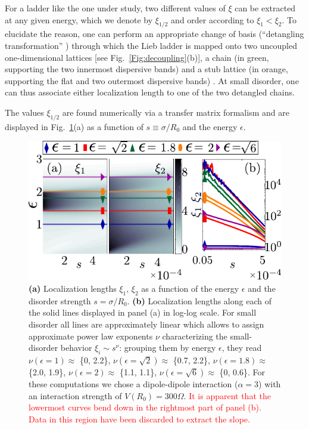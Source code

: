 \documentclass[prl,aps,twocolumn,showpacs,superscriptaddress,longbibliography]{revtex4-1}
\newcommand{\changer}[1]{\textcolor{red}{#1}}
\begin{document}
For a ladder like the one under study, two different values of $\xi$ can be extracted at any given energy, which we denote by $\xi_{1/2}$ and order according to $\xi_1 < \xi_2$. To elucidate the reason, one can perform an appropriate change of basis (``detangling transformation'' \cite{a_Flach_EPL_14,Leykam2017}) through which the Lieb ladder is mapped onto two uncoupled one-dimensional lattices [see Fig.~\ref{Fig:decoupling}(b)], a chain (in green, supporting the two innermost dispersive bands) and a stub lattice (in orange, supporting the flat and two outermost dispersive bands) \cite{SM}. At small disorder, one can thus associate either localization length to one of the two detangled chains.

The values $\xi_{1/2}$ are found numerically via a transfer matrix formalism and are displayed in Fig.~\ref{Fig:2D_loc_length}(a) as a function of $s \equiv \sigma / R_0$ and the energy $\epsilon$.
\begin{figure}
\includegraphics[width=\columnwidth]{Figure3.pdf}
\caption{\textbf{(a)} Localization lengths $\xi_1,\,\xi_2$ as a function of the energy $\epsilon$ and the disorder strength $s = \sigma / R_0$.
\textbf{(b)} Localization lengths along each of the solid lines displayed in panel (a) in log-log scale. For small disorder all lines are approximately linear which allows to assign approximate power law exponents $\nu$ characterizing the small-disorder behavior $\xi_i \sim s^\nu$: grouping them by energy $\epsilon$, they read $\nu\left(\epsilon = 1\right) \approx$ \{0, 2.2\}, $\nu\left(\epsilon = \sqrt{2}\right)\approx$ \{0.7, 2.2\}, $\nu\left(\epsilon = 1.8\right)\approx$ \{2.0, 1.9\}, $\nu\left(\epsilon = 2\right)\approx$ \{1.1, 1.1\}, $\nu\left(\epsilon = \sqrt{6}\right)\approx$ \{0, 0.6\}. For these computations we chose a dipole-dipole interaction ($\alpha = 3$) with an interaction strength of $V(R_0) = 300\Omega$. \changer{It is apparent that the lowermost curves bend down in the rightmost part of panel (b). Data in this region have been discarded to extract the slope.}}
 \label{Fig:2D_loc_length}
\end{figure}
\end{document}
